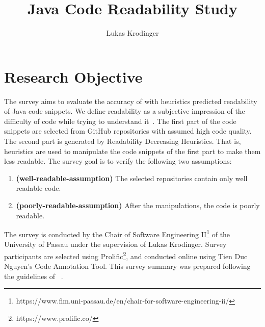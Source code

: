 \documentclass[%
class=scrreprt,
chapterprefix=false,%
open=right,%
twoside=false,%
paper=a4,%
logofile={Logo\_zentral\_farbig\_EN.png},%
thesistype=masterproposal,%
UKenglish,%
]{se2thesis}
\author{Lukas Krodinger}
\title{Java Code Readability Study}
\institute{Chair of Software Engineering II}
\begin{document}
	
	\frontmatter
	
	\maketitle
	
	\mainmatter
	
\section{Research Objective}
The survey aims to evaluate the accuracy of with heuristics predicted readability of Java code snippets. 
We define readability as a subjective impression of the difficulty of code while trying to understand it~\cite{posnett2011simpler, buse2009learning}.
The first part of the code snippets are selected from GitHub repositories with assumed high code quality.
The second part is generated by Readability Decreasing Heuristics. That is, heuristics are used to manipulate the code snippets of the first part to make them less readable.
The survey goal is to verify the following two assumptions:
\begin{enumerate}
	\item \label{well-readable-assumption} \textbf{(well-readable-assumption)} The selected repositories contain only well readable code.
	\item \label{poorly-readable-assumption} \textbf{(poorly-readable-assumption)} After the manipulations, the code is poorly readable.
\end{enumerate}

The survey is conducted by the Chair of Software Engineering II\footnote{https://www.fim.uni-passau.de/en/chair-for-software-engineering-ii/} of the University of Passau under the supervision of Lukas Krodinger.
Survey participants are selected using Prolific\footnote{https://www.prolific.co/}, and conducted online using Tien Duc Nguyen's Code Annotation Tool. This survey summary was prepared following the guidelines of \citeauthor{linaker2015guidelines}~\cite{linaker2015guidelines}.
\end{document}

